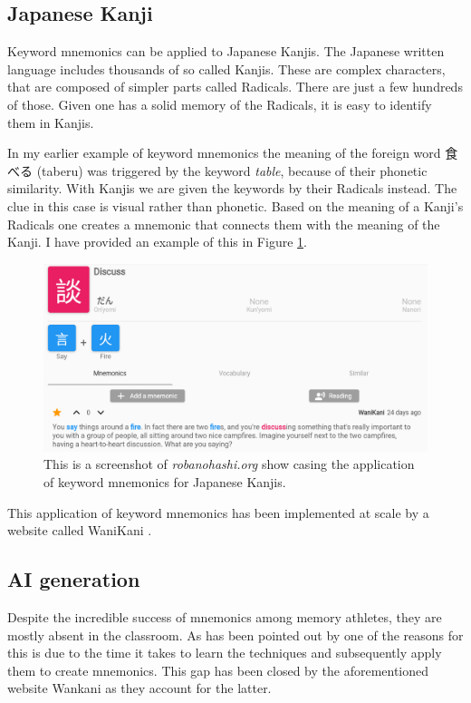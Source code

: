 \subsection{Japanese Kanji}
Keyword mnemonics can be applied to Japanese Kanjis. The Japanese written language includes thousands of so called Kanjis. These are complex characters, that are composed of simpler parts called Radicals. There are just a few hundreds of those. Given one has a solid memory of the Radicals, it is easy to identify them in Kanjis.

In my earlier example of keyword mnemonics the meaning of the foreign word 食べる (taberu) was triggered by the keyword \emph{table}, because of their phonetic similarity. With Kanjis we are given the keywords by their Radicals instead. The clue in this case is visual rather than phonetic. Based on the meaning of a Kanji's Radicals one creates a mnemonic that connects them with the meaning of the Kanji. I have provided an example of this in Figure \ref{figure:robanohashi_example}.

\begin{figure}
    \centering
    \includegraphics[width=400pt]{resources/robanohashi_example.png}
    \caption{This is a screenshot of \emph{robanohashi.org} show casing the application of keyword mnemonics for Japanese Kanjis.}
    \label{figure:robanohashi_example}
\end{figure}
This application of keyword mnemonics has been implemented at scale by a website called WaniKani \cite{wanikani}. 

\subsection{AI generation}
Despite the incredible success of mnemonics among memory athletes, they are mostly absent in the classroom. As has been pointed out by \cite{putnam_2015} one of the reasons for this is due to the time it takes to learn the techniques and subsequently apply them to create mnemonics. This gap has been closed by the aforementioned website Wankani as they account for the latter. 


